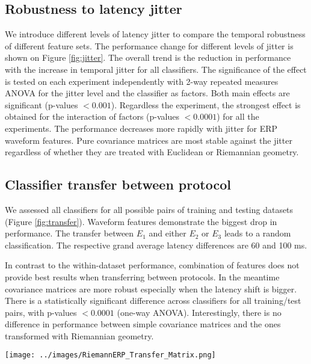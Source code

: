 \documentclass[12pt]{iopart}
\begin{document}
\subsection{Robustness to latency jitter}

We introduce different levels of latency jitter to compare the temporal robustness
of different feature sets.
The performance change for different levels of jitter is shown on Figure \ref{fig:jitter}.
The overall trend is the reduction in performance with the increase in temporal jitter for all classifiers.
The significance of the effect is tested on each experiment independently
with 2-way repeated measures ANOVA for the jitter level and the classifier
as factors. Both main effects are significant (p-values $<0.001$). 
Regardless the experiment, the strongest effect is obtained for the interaction
of factors (p-values $< 0.0001$) for all the experiments. The performance decreases more
rapidly with jitter for ERP waveform features.
Pure covariance matrices are most stable against the jitter regardless of whether they are
treated with Euclidean or Riemannian geometry.

\subsection{Classifier transfer between protocol}
We assessed all classifiers for all possible pairs of training 
and testing datasets (Figure \ref{fig:transfer}).
Waveform features demonstrate the biggest drop
in performance. The transfer between $E_1$ and either $E_2$ or $E_3$
leads to a random classification. The respective grand average 
latency differences are 60 and 100 ms.

In contrast to the within-dataset performance, combination of features
does not provide best results when transferring between protocols.
In the meantime covariance matrices are more robust
especially when the latency shift is bigger.
There is a statistically significant difference across classifiers
for all training/test pairs, with p-values $< 0.0001$ (one-way ANOVA).
Interestingly, there is no difference in performance between simple covariance matrices
and the ones transformed with Riemannian geometry.


\begin{figure*}[!t]
    \centerline{\texttt{[image: ../images/RiemannERP\_Transfer\_Matrix.png]}}
    \caption{Cross-protocol classifier transfer. First three matrices show AUC estimated
    on test dataset (y-axis) with a classifier trained on a training dataset (x-axis).
    The right-most matrix provides p-values obtained with ANOVA when comparing classifiers
    for each train/test pair.}
\label{fig:transfer}
\end{figure*}
\end{document}
